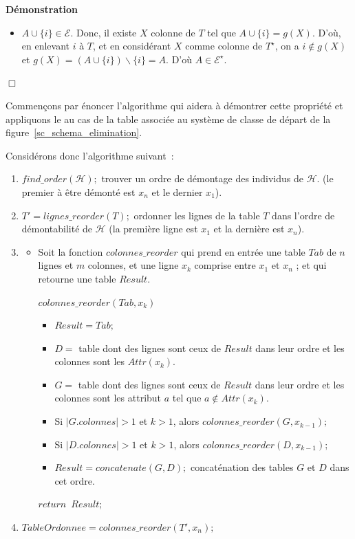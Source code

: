 \documentclass[a4paper]{report}
\renewcommand{\textbf}[1]{\begingroup\bfseries\mathversion{bold}#1\endgroup}
\newenvironment{preuve}{\textbf{Démonstration}}{}
\begin{document}
\begin{preuve}
\begin{itemize}
\begin{itemize}
\begin{itemize}
          \item $A \cup \{i\} \in \mathcal{E}.$
          Donc, il existe $X$ colonne de $T$ tel que $A \cup \{i\} = g(X)$.
          D'où, en enlevant $i$ à $T$, et en considérant $X$ comme colonne de $T^{\star}$, 
          on a $i \notin g(X)$ et $g(X) = (A \cup \{i\}) \backslash \{i\} = A$.
          D'où $A \in \mathcal{E}^{\star}$.
          \end{itemize}
    \end{itemize}
\end{itemize}

$\Box$
\end{preuve}

Commençons par énoncer l'algorithme qui aidera à démontrer cette propriété et appliquons le au cas de la table associée au système de classe de départ de
la figure~\ref{sc_schema_elimination}.

Considérons donc l'algorithme suivant~:

\begin{enumerate}
\item $find\_order(\mathcal{H});$ trouver un ordre de démontage des individus de $\mathcal{H}$. (le premier à être démonté est $x_n$ et le dernier $x_1$).
\item $T' = lignes\_reorder(T);$ ordonner les lignes de la table $T$ dans l'ordre de démontabilité de $\mathcal{H}$ (la première ligne est $x_1$ et la dernière est $x_n$).
\item
  \begin{itemize}
	\item Soit la fonction  $colonnes\_reorder$ qui prend en entrée une table $Tab$ de $n$ lignes et $m$ colonnes, et une ligne $x_k$ comprise entre $x_1$ et $x_n$ ; et qui retourne
 une table $Result$.

		  $colonnes\_reorder(Tab, x_k)$
		  \begin{itemize}
		   \item $Result = Tab;$
		   \item $D =$ table dont des lignes sont ceux de $Result$ dans leur ordre et les colonnes sont les $Attr(x_k)$.
		   \item $G =$ table dont des lignes sont ceux de $Result$ dans leur ordre et les colonnes sont les attribut $a$ tel que $a \notin Attr(x_k)$.
		   \item Si $|G.colonnes| > 1$ et $k > 1$, alors $colonnes\_reorder(G, x_{k-1});$
		   \item Si $|D.colonnes| > 1$ et $k > 1$, alors $colonnes\_reorder(D, x_{k-1});$
           \item $Result = concatenate (G, D);$ concaténation des tables $G$ et $D$ dans cet ordre.
		  \end{itemize}
		  $return$~$Result;$
  \end{itemize}
\item $TableOrdonnee = colonnes\_reorder(T', x_n);$
\end{enumerate}
\end{document}
